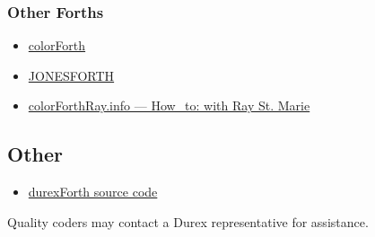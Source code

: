 \subsubsection{Other Forths}

\begin{itemize}
\item \href{http://www.colorforth.com/cf.html}{colorForth}
\item \href{http://www.annexia.org/forth}{JONESFORTH}
\item \href{http://colorforthray.info/}{colorForthRay.info --- How\_to: with Ray St. Marie}
\end{itemize}

\subsection{Other}

\begin{itemize}
\item \href{http://code.google.com/p/durexforth/}{durexForth source code}
\end{itemize}

Quality coders may contact a Durex representative for assistance.
